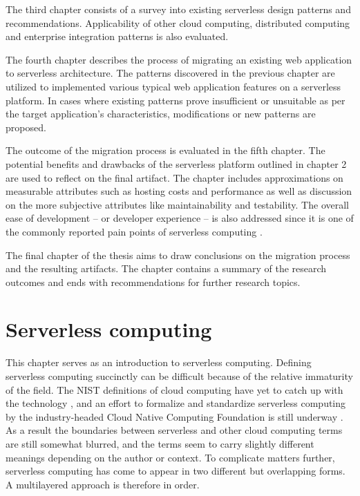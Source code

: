 \documentclass[utf8,english]{gradu3}
\begin{document}
The third chapter consists of a survey into existing serverless design patterns and recommendations. Applicability of other cloud computing, distributed computing and enterprise integration patterns is also evaluated.

The fourth chapter describes the process of migrating an existing web application to serverless architecture. The patterns discovered in the previous chapter are utilized to implemented various typical web application features on a serverless platform. In cases where existing patterns prove insufficient or unsuitable as per the target application's characteristics, modifications or new patterns are proposed.

The outcome of the migration process is evaluated in the fifth chapter. The potential benefits and drawbacks of the serverless platform outlined in chapter 2 are used to reflect on the final artifact. The chapter includes approximations on measurable attributes such as hosting costs and performance as well as discussion on the more subjective attributes like maintainability and testability. The overall ease of development -- or developer experience -- is also addressed since it is one of the commonly reported pain points of serverless computing \parencite{van2017spec}.

The final chapter of the thesis aims to draw conclusions on the migration process and the resulting artifacts. The chapter contains a summary of the research outcomes and ends with recommendations for further research topics.


\chapter{Serverless computing} \label{cha:serverless}

This chapter serves as an introduction to serverless computing. Defining serverless computing succinctly can be difficult because of the relative immaturity of the field. The NIST definitions of cloud computing have yet to catch up with the technology \parencite{nist11definitions}, and an effort to formalize and standardize serverless computing by the industry-headed Cloud Native Computing Foundation is still underway \parencite{cncf18serverlessWG}. As a result the boundaries between serverless and other cloud computing terms are still somewhat blurred, and the terms seem to carry slightly different meanings depending on the author or context. To complicate matters further, serverless computing has come to appear in two different but overlapping forms. A multilayered approach is therefore in order.
\end{document}
